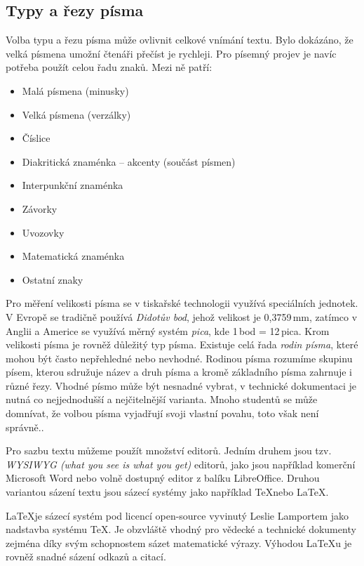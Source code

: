 \documentclass{article}
\begin{document}
\subsection{Typy a řezy písma} 
Volba typu a řezu písma může ovlivnit celkové vnímání textu. Bylo dokázáno, že velká písmena umožní čtenáři přečíst je rychleji.\cite{pusnik2006} Pro písemný projev je navíc potřeba použít celou řadu znaků. Mezi ně patří:\cite{cerna2006}
\begin{itemize}
    \item Malá písmena (minusky)
    \item Velká písmena (verzálky)
    \item Číslice
    \item Diakritická znaménka -- akcenty (součást písmen)
    \item Interpunkční znaménka
    \item Závorky
    \item Uvozovky
    \item Matematická znaménka
    \item Ostatní znaky
\end{itemize}
Pro měření velikosti písma se v tiskařské technologii využívá speciálních jednotek. V Evropě se tradičně používá \emph{Didotův bod}, jehož velikost je 0,3759\,mm, zatímco v Anglii a Americe se využívá měrný systém \emph{pica}, kde 1\,bod = 12\,pica.\cite{janak2001} 
Krom velikosti písma je rovněž důležitý typ písma. Existuje celá řada \emph{rodin písma}, které mohou být často nepřehledné nebo nevhodné. Rodinou písma rozumíme skupinu písem, kterou sdružuje název a druh písma a kromě základního písma zahrnuje i různé řezy.\cite{sirucek2006} Vhodné písmo může být nesnadné vybrat, v technické dokumentaci je nutná co nejjednodušší a nejčitelnější varianta. Mnoho studentů se může domnívat, že volbou písma vyjadřují svoji vlastní povahu, toto však není správně.\cite{mackiewicz2003}. 

Pro sazbu textu můžeme použít množství editorů. Jedním druhem jsou tzv. \emph{WYSIWYG (what you see is what you get)} editorů, jako jsou například komerční Microsoft Word nebo volně dostupný editor z balíku LibreOffice. Druhou variantou sázení textu jsou sázecí systémy jako například \TeX nebo \LaTeX. \cite{lukes2013} 

\LaTeX je sázecí systém pod licencí open-source vyvinutý Leslie Lamportem jako nadstavba systému \TeX. Je obzvláště vhodný pro vědecké a technické dokumenty zejména díky svým schopnostem sázet matematické výrazy. Výhodou \LaTeX u je rovněž snadné sázení odkazů a citací.\cite{kottwitz2011}
\pagebreak

\end{document}
